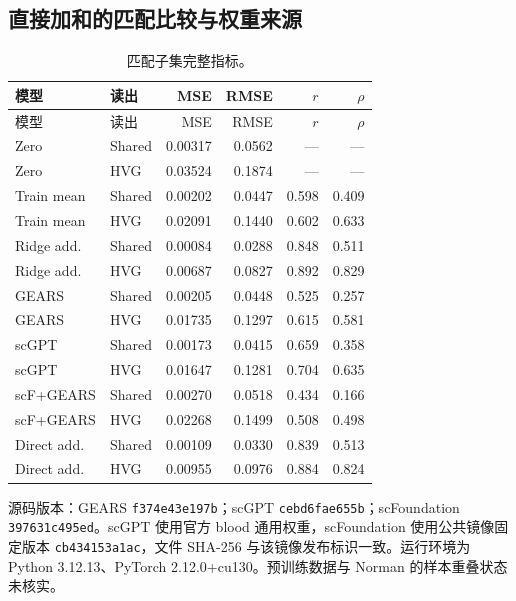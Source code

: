 \clearpage\subsection{直接加和的匹配比较与权重来源}
{\footnotesize\linespread{1}\selectfont\setlength{\tabcolsep}{4pt}\renewcommand{\arraystretch}{1.08}\begin{longtable}{llrrrr}\caption{匹配子集完整指标。}\\\toprule 模型 & 读出 & MSE & RMSE & $r$ & $\rho$\\\midrule\endfirsthead\toprule 模型 & 读出 & MSE & RMSE & $r$ & $\rho$\\\midrule\endhead
Zero & Shared & 0.00317 & 0.0562 & --- & ---\\
Zero & HVG & 0.03524 & 0.1874 & --- & ---\\
Train mean & Shared & 0.00202 & 0.0447 & 0.598 & 0.409\\
Train mean & HVG & 0.02091 & 0.1440 & 0.602 & 0.633\\
Ridge add. & Shared & 0.00084 & 0.0288 & 0.848 & 0.511\\
Ridge add. & HVG & 0.00687 & 0.0827 & 0.892 & 0.829\\
GEARS & Shared & 0.00205 & 0.0448 & 0.525 & 0.257\\
GEARS & HVG & 0.01735 & 0.1297 & 0.615 & 0.581\\
scGPT & Shared & 0.00173 & 0.0415 & 0.659 & 0.358\\
scGPT & HVG & 0.01647 & 0.1281 & 0.704 & 0.635\\
scF+GEARS & Shared & 0.00270 & 0.0518 & 0.434 & 0.166\\
scF+GEARS & HVG & 0.02268 & 0.1499 & 0.508 & 0.498\\
Direct add. & Shared & 0.00109 & 0.0330 & 0.839 & 0.513\\
Direct add. & HVG & 0.00955 & 0.0976 & 0.884 & 0.824\\
\bottomrule\end{longtable}}
{\footnotesize 源码版本：GEARS \texttt{f374e43e197b}；scGPT \texttt{cebd6fae655b}；scFoundation \texttt{397631c495ed}。scGPT 使用官方 blood 通用权重，scFoundation 使用公共镜像固定版本 \texttt{cb434153a1ac}，文件 SHA-256 与该镜像发布标识一致。运行环境为 Python 3.12.13、PyTorch 2.12.0+cu130。预训练数据与 Norman 的样本重叠状态未核实。}\par
